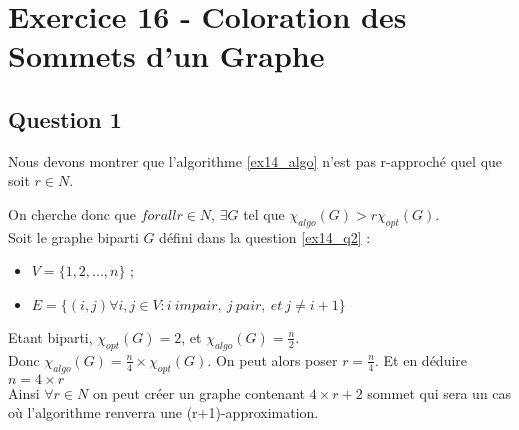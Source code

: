 
\section{Exercice 16 - Coloration des Sommets d'un Graphe}\label{ex16}

\subsection{Question 1}\label{ex16_q1}
Nous devons montrer que l'algorithme \ref{ex14_algo} n'est pas r-approch\'e quel que soit
$r \in N$.




On cherche donc que $forall r \in N$, $\exists G$ tel que $\chi_{algo}(G) >
r\chi_{opt}(G)$.\\
Soit le graphe biparti $G$ d\'efini dans la question \ref{ex14_q2} :
\begin{itemize}
	\item $V = \{1,2,...,n\}$ ;
	\item $E = \{(i,j) \forall i,j \in V : i\ impair,\ j\ pair,\ et\ j \neq i+1\}$
\end{itemize}
Etant biparti, $\chi_{opt}(G) = 2$, et $\chi_{algo}(G) = \frac{n}{2}$.\\
Donc $\chi_{algo}(G) = \frac{n}{4} \times \chi_{opt}(G)$.
On peut alors poser $r = \frac{n}{4}$. Et en d\'eduire $n = 4 \times r$\\
Ainsi $\forall r \in N$ on peut cr\'eer un graphe contenant $4 \times r + 2$ sommet qui
sera un cas o\`u l'algorithme renverra une (r+1)-approximation.

